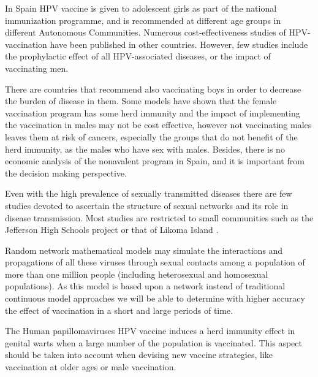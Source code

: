 In Spain HPV vaccine is given to adolescent girls as part of the national immunization programme, and is recommended at different age groups in different Autonomous Communities. Numerous cost-effectiveness studies of HPV-vaccination have been published in other countries. However, few studies include the prophylactic effect of all HPV-associated diseases, or the impact of vaccinating men.

There are countries that recommend also vaccinating boys in order to decrease the burden of disease in them. Some models have shown that the female vaccination program has some herd immunity and the impact of implementing the vaccination in males may not be cost effective, however not vaccinating males leaves them at risk of cancers, especially the groups that do not benefit of the herd immunity, as the males who have sex with males.
Besides, there is no economic analysis of the nonavalent program in Spain, and it is important from the decision making perspective.

Even with the high prevalence of sexually transmitted diseases there are few studies devoted to ascertain the structure of sexual networks and its role in disease transmission. Most studies are restricted to small communities such as the Jefferson High Schools project \cite{bearman2004chains} or that of Likoma Island \cite{helleringer2007sexual}.

Random network mathematical models may simulate the interactions and propagations of all these viruses through sexual contacts among a population of more than one million people (including heterosexual and homosexual populations). As this model is based upon a network instead of traditional continuous model approaches \cite{elbasha2007model} we will be able to determine with higher accuracy the effect of vaccination in a short and large periods of time.

The Human papillomaviruses HPV vaccine induces a herd immunity effect in genital warts when a large number of the population is vaccinated. This aspect should be taken into account when devising new vaccine strategies, like vaccination at older ages or male vaccination. 


